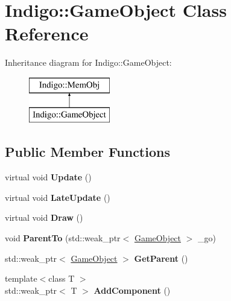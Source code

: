 \hypertarget{class_indigo_1_1_game_object}{}\section{Indigo\+:\+:Game\+Object Class Reference}
\label{class_indigo_1_1_game_object}
Inheritance diagram for Indigo\+:\+:Game\+Object\+:\begin{figure}[H]
\begin{center}
\leavevmode
\includegraphics[height=2.000000cm]{class_indigo_1_1_game_object}
\end{center}
\end{figure}
\subsection*{Public Member Functions}
\begin{DoxyCompactItemize}
\item 
\mbox{\label{class_indigo_1_1_game_object_a88b1e4bb256ce4bb241a0449b6f8c272}} 
virtual void {\bfseries Update} ()
\item 
\mbox{\label{class_indigo_1_1_game_object_a0e0b18a5e6c8c8638be4618576412e5b}} 
virtual void {\bfseries Late\+Update} ()
\item 
\mbox{\label{class_indigo_1_1_game_object_a3c6beac479284b63adf0ee008e5441fa}} 
virtual void {\bfseries Draw} ()
\item 
\mbox{\label{class_indigo_1_1_game_object_ae2c7042e5f1617f8ae183415d37c109c}} 
void {\bfseries Parent\+To} (std\+::weak\+\_\+ptr$<$ \hyperlink{class_indigo_1_1_game_object}{Game\+Object} $>$ \+\_\+go)
\item 
\mbox{\label{class_indigo_1_1_game_object_a829a4d75c3ec3ab8d997e004f19ecd75}} 
std\+::weak\+\_\+ptr$<$ \hyperlink{class_indigo_1_1_game_object}{Game\+Object} $>$ {\bfseries Get\+Parent} ()
\item 
\mbox{\label{class_indigo_1_1_game_object_ac2716d3d4c2689b075205cd997966557}} 
{\footnotesize template$<$class T $>$ }\\std\+::weak\+\_\+ptr$<$ T $>$ {\bfseries Add\+Component} ()
\end{DoxyCompactItemize}
